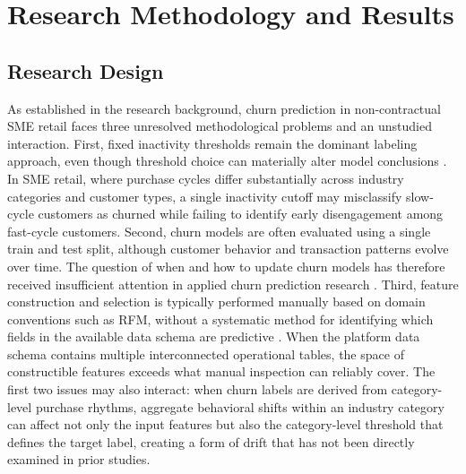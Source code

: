 
\chapter{Research Methodology and Results}
\section{Research Design}
\label{sec:research-design}

As established in the research background, churn prediction in non-contractual SME retail faces three unresolved methodological problems and an unstudied interaction. First, fixed inactivity thresholds remain the dominant labeling approach, even though threshold choice can materially alter model conclusions \cite{mirkovic2022}. In SME retail, where purchase cycles differ substantially across industry categories and customer types, a single inactivity cutoff may misclassify slow-cycle customers as churned while failing to identify early disengagement among fast-cycle customers. Second, churn models are often evaluated using a single train and test split, although customer behavior and transaction patterns evolve over time. The question of when and how to update churn models has therefore received insufficient attention in applied churn prediction research \cite{imani2025}. Third, feature construction and selection is typically performed manually based on domain conventions such as RFM, without a systematic method for identifying which fields in the available data schema are predictive \cite{imani2025}. When the platform data schema contains multiple interconnected operational tables, the space of constructible features exceeds what manual inspection can reliably cover. The first two issues may also interact: when churn labels are derived from category-level purchase rhythms, aggregate behavioral shifts within an industry category can affect not only the input features but also the category-level threshold that defines the target label, creating a form of drift that has not been directly examined in prior studies.

